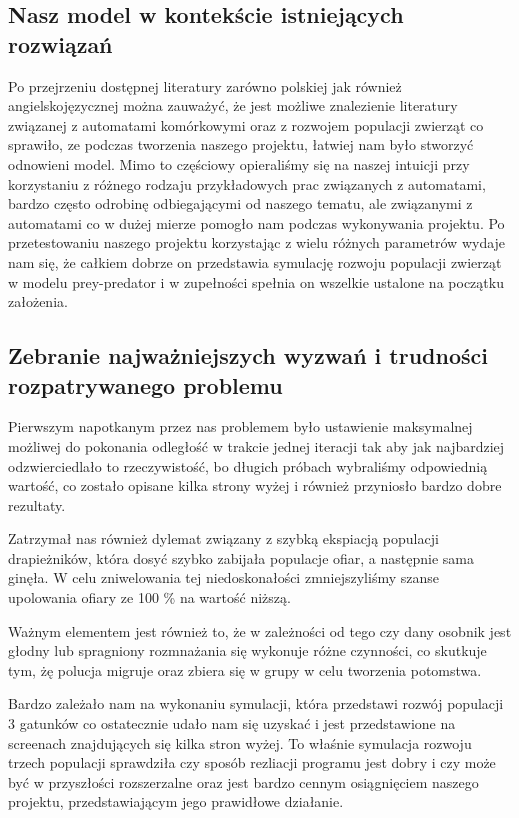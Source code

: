 \subsection{Nasz model w kontekście istniejących rozwiązań}
Po przejrzeniu dostępnej literatury zarówno polskiej jak również angielskojęzycznej można zauważyć, że jest możliwe znalezienie literatury związanej z automatami komórkowymi oraz z rozwojem populacji zwierząt co sprawiło, ze podczas tworzenia naszego projektu, łatwiej nam było stworzyć odnowieni model. Mimo to częściowy opieraliśmy się na naszej intuicji przy korzystaniu z różnego rodzaju przykładowych prac związanych z automatami, bardzo często odrobinę odbiegającymi od naszego tematu, ale związanymi z automatami co w dużej mierze pomogło nam podczas wykonywania projektu.
Po przetestowaniu naszego projektu korzystając z wielu różnych parametrów wydaje nam się, że całkiem dobrze on przedstawia symulację rozwoju populacji zwierząt w modelu prey-predator i w zupełności spełnia on wszelkie ustalone na początku założenia.

\subsection{Zebranie najważniejszych wyzwań i trudności rozpatrywanego problemu}


Pierwszym napotkanym przez nas problemem było ustawienie maksymalnej możliwej do pokonania odległość w trakcie jednej iteracji tak aby jak najbardziej odzwierciedlało to rzeczywistość, bo długich próbach wybraliśmy odpowiednią wartość, co zostało opisane kilka strony wyżej i również przyniosło bardzo dobre rezultaty.

Zatrzymał nas również dylemat związany z szybką ekspiacją populacji drapieżników, która dosyć szybko zabijała populacje ofiar, a następnie sama ginęła. W celu zniwelowania tej niedoskonałości zmniejszyliśmy szanse upolowania ofiary ze 100 \% na wartość niższą.

Ważnym elementem jest również to, że w zależności od tego czy dany osobnik jest głodny lub spragniony rozmnażania się wykonuje różne czynności, co skutkuje tym, żę polucja migruje oraz zbiera się w grupy w celu tworzenia potomstwa.

Bardzo zależało nam na wykonaniu symulacji, która przedstawi rozwój populacji 3 gatunków co ostatecznie udało nam się uzyskać i jest przedstawione na screenach znajdujących się kilka stron wyżej. To właśnie symulacja rozwoju trzech populacji  sprawdziła czy sposób rezliacji programu jest dobry i czy może być w przyszłości rozszerzalne oraz jest  bardzo cennym osiągnięciem naszego projektu, przedstawiającym jego prawidłowe działanie.

